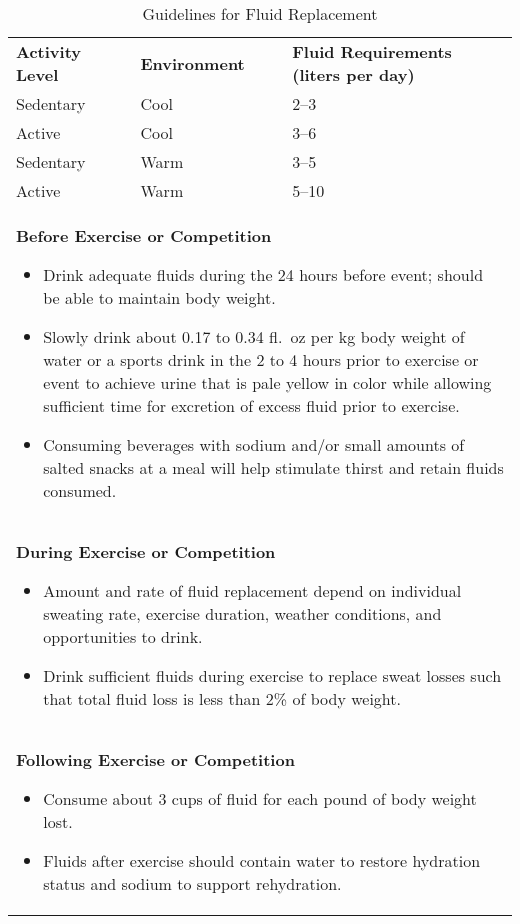 \documentclass[title={Chapter 11}]{fdsn201notes}
\begin{document}
\begin{table}[H]
	\centering
	\begin{threeparttable}
		\caption{Guidelines for Fluid Replacement}
		\label{tab:guidelines-for-fluid-replacement}
		\begin{tabular}{p{}p{}p{}}
			\rowcolor{rowdarkgreen}\textbf{Activity Level} & \textbf{Environment} & \textbf{Fluid Requirements (liters per day)}\\
			Sedentary & Cool & 2--3\\
			Active & Cool & 3--6\\
			Sedentary & Warm & 3--5\\
			Active & Warm & 5--10\\
			\multicolumn{3}{p{\textwidth}}{\textbf{Before Exercise or Competition}
				\begin{itemize}
					\item Drink adequate fluids during the 24 hours before event; should be able to maintain body weight.
					\item Slowly drink about 0.17 to 0.34 fl.\ oz per kg body weight of water or a sports drink in the 2 to 4 hours prior to exercise or event to achieve urine that is pale yellow in color while allowing sufficient time for excretion of excess fluid prior to exercise.
					\item Consuming beverages with sodium and/or small amounts of salted snacks at a meal will help stimulate thirst and retain fluids consumed.
				\end{itemize}}~\\
			\multicolumn{3}{p{\textwidth}}{\textbf{During Exercise or Competition}
				\begin{itemize}
					\item Amount and rate of fluid replacement depend on individual sweating rate, exercise duration, weather conditions, and opportunities to drink.
					\item Drink sufficient fluids during exercise to replace sweat losses such that total fluid loss is less than 2\% of body weight.
				\end{itemize}}~\\
			\multicolumn{3}{p{\textwidth}}{\textbf{Following Exercise or Competition}
				\begin{itemize}
					\item Consume about 3 cups of fluid for each pound of body weight lost.
					\item Fluids after exercise should contain water to restore hydration status and sodium to support rehydration.

\end{itemize}}
\end{tabular}
\end{threeparttable}
\end{table}
\end{document}
